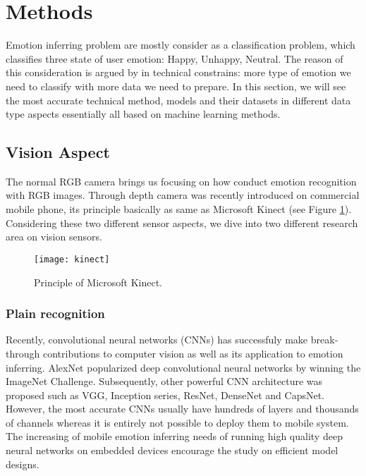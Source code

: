 \section{Methods}\label{sec:methods}

Emotion inferring problem are mostly consider as a classification problem, which classifies three state of user emotion: Happy, Unhappy, Neutral. The reason of this consideration is argued by in technical constrains: more type of emotion we need to classify with more data we need to prepare.  In this section, we will see the most accurate technical method, models and their datasets in different data type aspects essentially all based on machine learning methods.

\subsection{Vision Aspect} \label{subsec:vision-model}

The normal RGB camera brings us focusing on how conduct emotion recognition with RGB images. Through depth camera was recently introduced on commercial mobile phone, its principle basically as same as Microsoft Kinect (see Figure \ref{fig:kinect}). Considering these two different sensor aspects, we dive into two different research area on vision sensors.

\begin{figure}
  \centering
  \texttt{[image: kinect]}
  \caption{Principle of Microsoft Kinect.}
  \label{fig:kinect}
\end{figure}

\subsubsection{Plain recognition}

Recently, convolutional neural networks (CNNs) has successfuly make break-through contributions to computer vision as well as its application to emotion inferring. 
AlexNet \cite{Krizhevsky2012} popularized deep convolutional neural networks by winning the ImageNet Challenge. Subsequently, other powerful CNN architecture was proposed such as VGG\cite{Simonyan2015}, Inception series\cite{Szegedy2014, Szegedy2015, Szegedy2016}, ResNet\cite{He2016}, DenseNet\cite{iandola2014densenet} and CapsNet\cite{sabour2017dynamic}. However, the most accurate CNNs usually have hundreds of
layers and thousands of channels whereas it is entirely not possible to deploy them to mobile system. The increasing of mobile emotion inferring needs of running high quality deep neural networks on embedded devices encourage the study on efficient model designs\cite{he2015convolutional}. 

